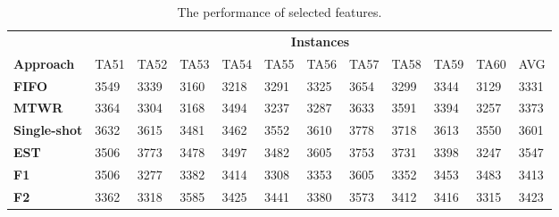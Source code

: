 \documentclass[runningheads]{llncs}
\begin{document}
\begin{table}
  \begin{center}
    \caption{The performance of selected features.}
    \label{tab4}

    \begin{tabular}{|l|l|l|l|l|l|l|l|l|l|l|l|} \hline
      & \multicolumn{11}{|c|}{\textbf{Instances}} \\ \cline{2-12}
      \textbf{Approach}   & TA51                           & TA52                           & TA53                           & TA54 & TA55                           & TA56                           & TA57                           & TA58 & TA59                           & TA60 & AVG  \\ \hline
      \textbf{FIFO}        & 3549                           & 3339                           & 3160                           & 3218 & 3291                           & 3325                           & 3654                           & 3299 & 3344                           & 3129 & 3331 \\
      \textbf{MTWR}        & 3364                           & 3304                           & 3168                           & 3494 & 3237                           & 3287                           & 3633                           & 3591 & 3394                           & 3257 & 3373 \\
      \textbf{Single-shot} & 3632                           & 3615                           & 3481                           & 3462 & 3552                           & 3610                           & 3778                           & 3718 & 3613                           & 3550 & 3601 \\
      \textbf{EST}         & 3506                           & 3773                           & 3478                           & 3497 & 3482                           & 3605                           & 3753                           & 3731 & 3398                           & 3247 & 3547 \\ \hline
      \textbf{F1}          & 3506                           & 3277                           & 3382                           & 3414 & 3308                           & 3353                           & 3605                           & 3352 & 3453                           & 3483 & 3413 \\
      \textbf{F2}          & 3362                           & 3318                           & 3585                           & 3425 & 3441                           & 3380                           & 3573                           & 3412 & 3416                           & 3315 & 3423 \\

\end{tabular}
\end{center}
\end{table}
\end{document}
